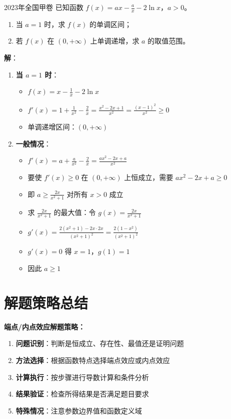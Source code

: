 \documentclass[a4paper,12pt]{ctexrep}
\begin{document}
\begin{examplebox}{2023年全国甲卷}
已知函数 $f(x) = ax - \frac{a}{x} - 2\ln x$，$a > 0$。
\begin{enumerate}
    \item 当 $a = 1$ 时，求 $f(x)$ 的单调区间；
    \item 若 $f(x)$ 在 $(0, +\infty)$ 上单调递增，求 $a$ 的取值范围。
\end{enumerate}

\textbf{解}：
\begin{enumerate}
    \item \textbf{当 $a = 1$ 时}：
    \begin{itemize}
        \item $f(x) = x - \frac{1}{x} - 2\ln x$
        \item $f'(x) = 1 + \frac{1}{x^2} - \frac{2}{x} = \frac{x^2 - 2x + 1}{x^2} = \frac{(x-1)^2}{x^2} \geq 0$
        \item 单调递增区间：$(0, +\infty)$
    \end{itemize}
    \item \textbf{一般情况}：
    \begin{itemize}
        \item $f'(x) = a + \frac{a}{x^2} - \frac{2}{x} = \frac{ax^2 - 2x + a}{x^2}$
        \item 要使 $f'(x) \geq 0$ 在 $(0, +\infty)$ 上恒成立，需要 $ax^2 - 2x + a \geq 0$
        \item 即 $a \geq \frac{2x}{x^2 + 1}$ 对所有 $x > 0$ 成立
        \item 求 $\frac{2x}{x^2 + 1}$ 的最大值：令 $g(x) = \frac{2x}{x^2 + 1}$
        \item $g'(x) = \frac{2(x^2 + 1) - 2x \cdot 2x}{(x^2 + 1)^2} = \frac{2(1 - x^2)}{(x^2 + 1)^2}$
        \item $g'(x) = 0$ 得 $x = 1$，$g(1) = 1$
        \item 因此 $a \geq 1$
    \end{itemize}
\end{enumerate}
\end{examplebox}

\section{解题策略总结}

\textbf{端点/内点效应解题策略：}
\begin{enumerate}
    \item \textbf{问题识别}：判断是恒成立、存在性、最值还是证明问题
    \item \textbf{方法选择}：根据函数特点选择端点效应或内点效应
    \item \textbf{计算执行}：按步骤进行导数计算和条件分析
    \item \textbf{结果验证}：检查所得结果是否满足题目要求
    \item \textbf{特殊情况}：注意参数边界值和函数定义域
\end{enumerate}
\end{document}
